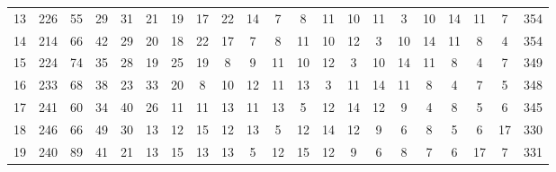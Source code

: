 \documentclass[12pt]{article}
\begin{document}
\begin{table}[h]
\begin{tabular}{*{21}{c}}
        13 &226 & 55 & 29  &31  &21  &19  &17  &22  &14  &7   &8   &11  &10  &11  &3   &10  &14  &11 &7   &354 \\
        14 &214 & 66 & 42  &29  &20  &18  &22  &17  &7   &8   &11  &10  &12  &3   &10  &14  &11  &8  &4   &354 \\
        15 &224 & 74 & 35  &28  &19  &25  &19  &8   &9   &11  &10  &12  &3   &10  &14  &11  &8   &4  &7   &349 \\
        16 &233 & 68 & 38  &23  &33  &20  &8   &10  &12  &11  &13  &3   &11  &14  &11  &8   &4   &7  &5   &348 \\
        17 &241 & 60 & 34  &40  &26  &11  &11  &13  &11  &13  &5   &12  &14  &12  &9   &4   &8   &5  &6   &345 \\
        18 &246 & 66 & 49  &30  &13  &12  &15  &12  &13  &5   &12  &14  &12  &9   &6   &8   &5   &6  &17  &330 \\
        19 &240 & 89 & 41  &21  &13  &15  &13  &13  &5   &12  &15  &12  &9   &6   &8   &7   &6   &17 &7   &331 \\
        \hline\hline
    \end{tabular}
\end{table}
\end{document}
